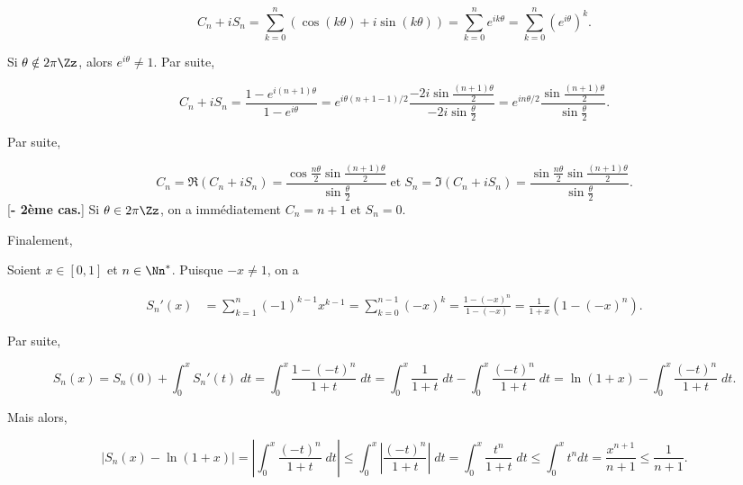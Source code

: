 {\begin{enumerate}
{$$C_n+iS_n=\sum_{k=0}^{n}(\cos(k\theta)+i\sin(k\theta))=\sum_{k=0}^{n}e^{ik\theta}=\sum_{k=0}^{n}(e^{i\theta})^k.$$

\begin{itemize}
 Si $\theta\notin2\pi\Zz$, alors $e^{i\theta}\neq1$. Par suite,

$$C_n+iS_n=\frac{1-e^{i(n+1)\theta}}{1-e^{i\theta}}=e^{i\theta(n+1-1)/2}\frac{-2i\sin\frac{(n+1)\theta}{2}}{-2i\sin
\frac{\theta}{2}}=e^{in\theta/2}\frac{\sin\frac{(n+1)\theta}{2}}{\sin
\frac{\theta}{2}}.$$

Par suite,

$$C_n=\Re(C_n+iS_n)=\frac{\cos\frac{n\theta}{2}\sin\frac{(n+1)\theta}{2}}{\sin\frac{\theta}{2}}\;\mbox{et}\;S_n=\Im(C_
n+iS_n)=\frac{\sin\frac{n\theta}{2}\sin\frac{(n+1)\theta}{2}}{\sin\frac{\theta}{2}}.$$
[\textbf{- 2ème cas.}] Si $\theta\in2\pi\Zz$, on a immédiatement $C_n=n+1$ et $S_n=0$.
\end{itemize}

Finalement,
\begin{center}
\end{center}
Soient $x\in[0,1]$ et $n\in\Nn^*$. Puisque $-x\neq1$, on a

\begin{align*}
S_n'(x)&=\sum_{k=1}^{n}(-1)^{k-1}x^{k-1}=\sum_{k=0}^{n-1}(-x)^{k}=\frac{1-(-x)^{n}}{1-(-x)}=\frac{1}{1+x}(1-(-x)^{n}).
\end{align*}

Par suite,

$$S_n(x)=S_n(0)+\int_{0}^{x}S_n'(t)\;dt=\int_{0}^{x}\frac{1-(-t)^{n}}{1+t}\;dt=\int_{0}^{x}\frac{1}{1+t}\;dt-
\int_{0}^{x}\frac{(-t)^{n}}{1+t}\;dt=\ln(1+x)-\int_{0}^{x}\frac{(-t)^{n}}{1+t}\;dt.$$

Mais alors,

$$|S_n(x)-\ln(1+x)|=\left|\int_{0}^{x}\frac{(-t)^{n}}{1+t}\;dt\right|\leq\int_{0}^{x}
\left|\frac{(-t)^{n}}{1+t}\right|\;dt=\int_{0}^{x}\frac{t^n}{1+t}\;dt
\leq\int_{0}^{x}t^{n}dt=\frac{x^{n+1}}{n+1}\leq\frac{1}{n+1}.$$

}
\end{enumerate}}
